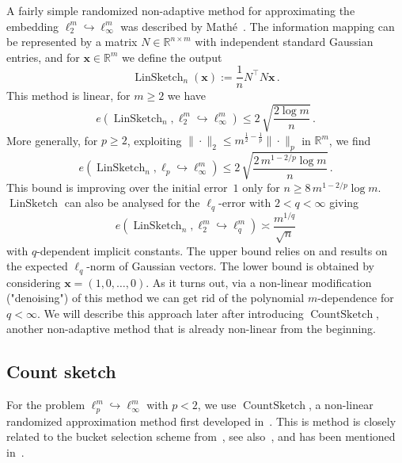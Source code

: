 \documentclass[12pt]{article}
\theoremstyle{plain}
\theoremstyle{definition}
\newcommand{\embed}{\hookrightarrow}
\renewcommand{\vec}{\boldsymbol}
\newcommand{\R}{{\mathbb R}}
\DeclareMathOperator{\linsketch}{LinSketch}
\DeclareMathOperator{\countsketch}{CountSketch}
\begin{document}
A fairly simple randomized non-adaptive method for approximating the embedding
$\ell_2^m \embed \ell_{\infty}^m$ was described by Math\'e~\cite{Ma91}.
The information mapping can be represented by a matrix $N \in \R^{n \times m}$ with independent standard Gaussian entries,
and for $\vec{x} \in \R^m$ we define the output
\begin{equation*}
    \linsketch_n(\vec{x}) := \frac{1}{n}N^\top N \vec{x} \,.
\end{equation*}
This method is linear, for $m \geq 2$ we have
\begin{equation*}
    e(\linsketch_n, \ell_2^m \embed \ell_{\infty}^m)
        \leq 2\,\sqrt{\frac{2 \log m}{n}} \,.
\end{equation*}
More generally, for $p \geq 2$, exploiting $\|\cdot\|_2 \leq m^{\frac{1}{2} - \frac{1}{p}} \|\cdot\|_p$ in $\R^m$, we find
\begin{equation}\label{eq:linsketcherror}
    e(\linsketch_n, \ell_p \embed \ell_{\infty}^m)
        \leq 2\,\sqrt{\frac{2 \, m^{1 - 2/p} \log m}{n}} \,.
\end{equation}
This bound is improving over the initial error~$1$ only for
$n \geq 8 \, m^{1-2/p} \log m$.
$\linsketch$ can also be analysed for the $\ell_q$-error with $2<q<\infty$ giving
\begin{equation}\label{eq:LinSketch-ell_q}
    e(\linsketch_n, \ell_2^m \embed \ell_q^m)
        \asymp \frac{m^{1/q}}{\sqrt{n}}
\end{equation}
with $q$-dependent implicit constants.
The upper bound relies on \cite[Prop~3.1]{Ku17} and
results on the expected $\ell_q$-norm of Gaussian vectors.
The lower bound is obtained by considering
\mbox{$\vec{x} = (1,0, \ldots, 0)$}.
As it turns out, via a non-linear modification ("denoising") of this method we can get rid of the polynomial $m$-dependence for $q < \infty$.
We will describe this approach later after introducing $\countsketch$,
another non-adaptive method that is already non-linear from the beginning.

\subsection{Count sketch}
\label{sec:countsketch}

For the problem $\ell_p^m \embed \ell_\infty^m$ with $p < 2$,
we use $\countsketch$, a non-linear randomized approximation method
first developed in~\cite{CCF04}.
This is method is closely related to the bucket selection scheme from~\cite[Sec~2.2]{KW24b}, see also~\cite[Lem~54]{LNW17}, and has been mentioned in~\cite[Rem~2.6]{KW24b}.
\end{document}

